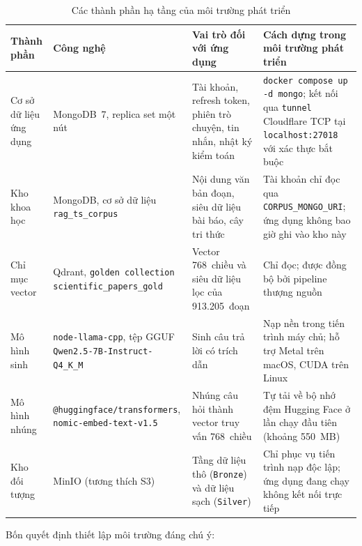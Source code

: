 \begin{table}[htbp]
\centering
\caption{Các thành phần hạ tầng của môi trường phát triển}
\label{tab:thanh-phan-ha-tang-dev}
\footnotesize
\setlength{\tabcolsep}{4pt}
\begin{tabularx}{\textwidth}{
  >{\raggedright\arraybackslash}p{2.9cm}
  >{\raggedright\arraybackslash}p{3.6cm}
  >{\raggedright\arraybackslash}p{4.0cm}
  >{\raggedright\arraybackslash}X
}
\toprule
\textbf{Thành phần} & \textbf{Công nghệ} & \textbf{Vai trò đối với ứng dụng} & \textbf{Cách dựng trong môi trường phát triển} \\
\midrule
Cơ sở dữ liệu ứng dụng & MongoDB~7, replica set một nút & Tài khoản, refresh token, phiên trò chuyện, tin nhắn, nhật ký kiểm toán & \texttt{docker compose up -d mongo}; kết nối qua \texttt{tunnel} Cloudflare TCP tại \texttt{localhost:\allowbreak{}27018} với xác thực bắt buộc \\
\midrule
Kho khoa học & MongoDB, cơ sở dữ liệu \texttt{rag\_\allowbreak{}ts\_\allowbreak{}corpus} & Nội dung văn bản đoạn, siêu dữ liệu bài báo, cây tri thức & Tài khoản chỉ đọc qua \texttt{CORPUS\_\allowbreak{}MONGO\_\allowbreak{}URI}; ứng dụng không bao giờ ghi vào kho này \\
\midrule
Chỉ mục vector & Qdrant, \texttt{golden collection} \texttt{scientific\_\allowbreak{}papers\_\allowbreak{}gold} & Vector 768~chiều và siêu dữ liệu lọc của 913.205~đoạn & Chỉ đọc; được đồng bộ bởi pipeline thượng nguồn \\
\midrule
Mô hình sinh & \texttt{node-\allowbreak{}llama-\allowbreak{}cpp}, tệp GGUF \texttt{Qwen2.5-\allowbreak{}7B-\allowbreak{}Instruct-\allowbreak{}Q4\_\allowbreak{}K\_\allowbreak{}M} & Sinh câu trả lời có trích dẫn & Nạp nền trong tiến trình máy chủ; hỗ trợ Metal trên macOS, CUDA trên Linux \\
\midrule
Mô hình nhúng & \texttt{@huggingface/\allowbreak{}transformers}, \texttt{nomic-\allowbreak{}embed-\allowbreak{}text-\allowbreak{}v1.5} & Nhúng câu hỏi thành vector truy vấn 768~chiều & Tự tải về bộ nhớ đệm Hugging Face ở lần chạy đầu tiên (khoảng 550~MB) \\
\midrule
Kho đối tượng & MinIO (tương thích S3) & Tầng dữ liệu thô (\texttt{Bronze}) và dữ liệu sạch (\texttt{Silver}) & Chỉ phục vụ tiến trình nạp độc lập; ứng dụng đang chạy không kết nối trực tiếp \\
\bottomrule
\end{tabularx}
\end{table}

Bốn quyết định thiết lập môi trường đáng chú ý:

